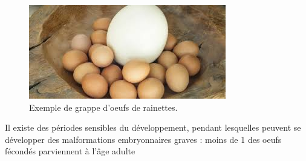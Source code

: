 \begin{figure}%
	\begin{center}
		\includegraphics[width=.9\textwidth]{laRepro/oeuf.jpg}	
	\end{center}
	\caption{Exemple de grappe d'oeufs de rainettes.}%
	\label{fig:autruche}


\end{figure}

Il existe des périodes sensibles du développement, pendant lesquelles peuvent se développer des malformations embryonnaires graves : moins de 1 des oeufs fécondés parviennent à l’âge adulte